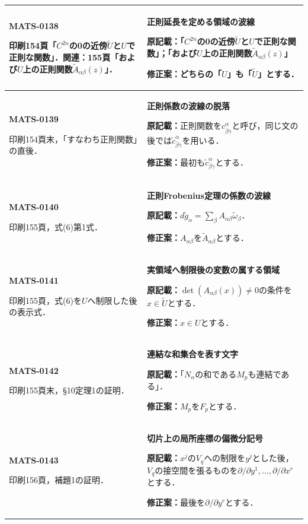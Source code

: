 \documentclass[a4paper,10pt]{ltjsarticle}
\begin{document}
\begin{longtable}{@{}>{\raggedright\arraybackslash}p{.19\linewidth}>{\raggedright\arraybackslash}p{.77\linewidth}@{}}
\hline
\hypertarget{MATS-0138}{}\textbf{MATS-0138}\par 印刷154頁「$C^{2n}$の0の近傍$\widetilde U$と$U$で正則な関数」．関連：155頁「および$U$上の正則関数$\widetilde A_{\alpha\beta}(z)$」． & \textbf{正則延長を定める領域の波線}\par\textbf{原記載：}「$C^{2n}$の0の近傍$\widetilde U$と$U$で正則な関数」；「および$U$上の正則関数$\widetilde A_{\alpha\beta}(z)$」\par\textbf{修正案：}どちらの「$U$」も「$\widetilde U$」とする． \\[3pt]
\hline
\hypertarget{MATS-0139}{}\textbf{MATS-0139}\par 印刷154頁末，「すなわち正則関数」の直後． & \textbf{正則係数の波線の脱落}\par\textbf{原記載：}正則関数を$c_{\bar\beta\bar\gamma}^{\alpha}$と呼び，同じ文の後では$\tilde c_{\bar\beta\bar\gamma}^{\alpha}$を用いる．\par\textbf{修正案：}最初も$\tilde c_{\bar\beta\bar\gamma}^{\alpha}$とする． \\[3pt]
\hline
\hypertarget{MATS-0140}{}\textbf{MATS-0140}\par 印刷155頁，式(6)第1式． & \textbf{正則Frobenius定理の係数の波線}\par\textbf{原記載：}$d\tilde g_\alpha=\sum_\beta A_{\alpha\beta}\tilde\omega_\beta$．\par\textbf{修正案：}$A_{\alpha\beta}$を$\widetilde A_{\alpha\beta}$とする． \\[3pt]
\hline
\hypertarget{MATS-0141}{}\textbf{MATS-0141}\par 印刷155頁，式(6)を$U$へ制限した後の表示式． & \textbf{実領域へ制限後の変数の属する領域}\par\textbf{原記載：}$\det(A_{\alpha\beta}(x))\ne0$の条件を$x\in\widetilde U$とする．\par\textbf{修正案：}$x\in U$とする． \\[3pt]
\hline
\hypertarget{MATS-0142}{}\textbf{MATS-0142}\par 印刷155頁末，§10定理1の証明． & \textbf{連結な和集合を表す文字}\par\textbf{原記載：}「$N_\alpha$の和である$M_p$も連結である」．\par\textbf{修正案：}$M_p$を$F_p$とする． \\[3pt]
\hline
\hypertarget{MATS-0143}{}\textbf{MATS-0143}\par 印刷156頁，補題1の証明． & \textbf{切片上の局所座標の偏微分記号}\par\textbf{原記載：}$x^j$の$V_q$への制限を$y^j$とした後，$V_q$の接空間を張るものを$\partial/\partial y^1,\ldots,\partial/\partial x^r$とする．\par\textbf{修正案：}最後を$\partial/\partial y^r$とする． \\[3pt]

\end{longtable}
\end{document}

